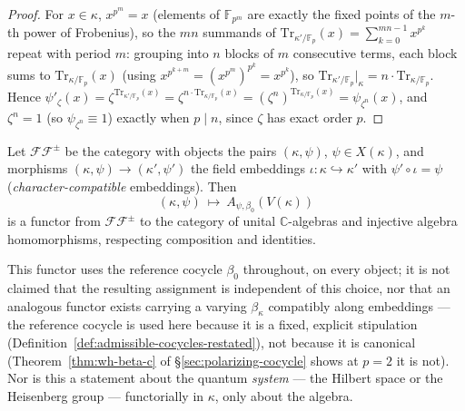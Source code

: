 
\begin{proof}
For $x\in\kappa$, $x^{p^m}=x$ (elements of $\mathbb{F}_{p^m}$ are exactly
the fixed points of the $m$-th power of Frobenius), so the $mn$ summands of
$\mathrm{Tr}_{\kappa'/\mathbb{F}_p}(x)=\sum_{k=0}^{mn-1}x^{p^k}$ repeat with
period $m$: grouping into $n$ blocks of $m$ consecutive terms, each block
sums to $\mathrm{Tr}_{\kappa/\mathbb{F}_p}(x)$ (using
$x^{p^{k+m}}=(x^{p^m})^{p^k}=x^{p^k}$), so
$\mathrm{Tr}_{\kappa'/\mathbb{F}_p}|_\kappa = n\cdot\mathrm{Tr}_{\kappa/\mathbb{F}_p}$.
Hence $\psi'_\zeta(x) = \zeta^{\mathrm{Tr}_{\kappa'/\mathbb{F}_p}(x)} = \zeta^{n\cdot\mathrm{Tr}_{\kappa/\mathbb{F}_p}(x)}
= (\zeta^n)^{\mathrm{Tr}_{\kappa/\mathbb{F}_p}(x)} = \psi_{\zeta^n}(x)$, and
$\zeta^n=1$ (so $\psi_{\zeta^n}\equiv 1$) exactly when $p\mid n$, since
$\zeta$ has exact order $p$.
\end{proof}

\statusProved
\begin{theorem}
\label{thm:wh-funct-b}
Let $\mathcal{FF}^\pm$ be the category with objects the pairs $(\kappa,\psi)$,
$\psi\in X(\kappa)$, and morphisms $(\kappa,\psi)\to(\kappa',\psi')$ the
field embeddings $\iota:\kappa\hookrightarrow\kappa'$ with
$\psi'\circ\iota=\psi$ (\emph{character-compatible} embeddings). Then
\[
(\kappa,\psi) \ \longmapsto\ A_{\psi,\beta_0}(V(\kappa))
\]
is a functor from $\mathcal{FF}^\pm$ to the category of unital
$\mathbb{C}$-algebras and injective algebra homomorphisms, respecting
composition and identities.
\end{theorem}

\begin{scope}
This functor uses the reference cocycle $\beta_0$ throughout, on every
object; it is not claimed that the resulting assignment is independent of
this choice, nor that an analogous functor exists carrying a varying
$\beta_\kappa$ compatibly along embeddings — the reference cocycle is used
here because it is a fixed, explicit stipulation
(Definition~\ref{def:admissible-cocycles-restated}), not because it is
canonical (Theorem~\ref{thm:wh-beta-c} of \S\ref{sec:polarizing-cocycle}
shows at $p=2$ it is not). Nor is this a statement about the quantum
\emph{system} — the Hilbert space or the Heisenberg group — functorially in
$\kappa$, only about the algebra.
\end{scope}

